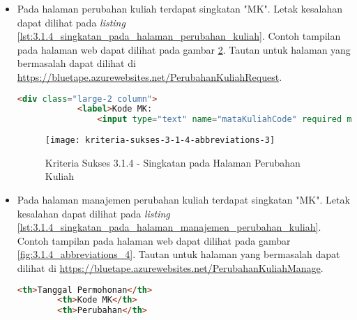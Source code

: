 \begin{itemize}
    \begin{figure}[H]
        \centering  
        \texttt{[image: kriteria-sukses-3-1-4-abbreviations-2]}  
        \caption[Kriteria Sukses 3.1.4 - Singkatan pada Halaman Manajemen Cetak Transkrip]{Kriteria Sukses 3.1.4 - Singkatan pada Halaman Manajemen Cetak Transkrip}
        \label{fig:3.1.4_abbreviations_2}  
    \end{figure}
    
    \item Pada halaman perubahan kuliah terdapat singkatan "MK". Letak kesalahan dapat dilihat pada \textit{listing} \ref{lst:3.1.4_singkatan_pada_halaman_perubahan_kuliah}. Contoh tampilan pada halaman web dapat dilihat pada gambar \ref{fig:3.1.4_abbreviations_3}. Tautan untuk halaman yang bermasalah dapat dilihat di \url{https://bluetape.azurewebsites.net/PerubahanKuliahRequest}.
    \begin{lstlisting}[frame=single, label={lst:3.1.4_singkatan_pada_halaman_perubahan_kuliah}, language=HTML, caption=Kriteria Sukses 3.1.4 - Singkatan pada Halaman Perubahan Kuliah]
        <div class="large-2 column">
            <label>Kode MK:
                <input type="text" name="mataKuliahCode" required maxlength="9" pattern="[A-Z]{3}[0-9]{3}([0-9]{3})?" title="Kode MK dalam format XYZ123"/>
    \end{lstlisting}

    \begin{figure}[H]
        \centering  
        \texttt{[image: kriteria-sukses-3-1-4-abbreviations-3]}  
        \caption[Kriteria Sukses 3.1.4 - Singkatan pada Halaman Perubahan Kuliah]{Kriteria Sukses 3.1.4 - Singkatan pada Halaman Perubahan Kuliah}
        \label{fig:3.1.4_abbreviations_3}  
    \end{figure}
    
    \item Pada halaman manajemen perubahan kuliah terdapat singkatan "MK". Letak kesalahan dapat dilihat pada \textit{listing} \ref{lst:3.1.4_singkatan_pada_halaman_manajemen_perubahan_kuliah}. Contoh tampilan pada halaman web dapat dilihat pada gambar \ref{fig:3.1.4_abbreviations_4}. Tautan untuk halaman yang bermasalah dapat dilihat di \url{https://bluetape.azurewebsites.net/PerubahanKuliahManage}.
    \begin{lstlisting}[frame=single, label={lst:3.1.4_singkatan_pada_halaman_manajemen_perubahan_kuliah}, language=HTML, caption=Kriteria Sukses 3.1.4 - Singkatan pada Halaman Manajemen Perubahan Kuliah]
        <th>Tanggal Permohonan</th>
        <th>Kode MK</th>
        <th>Perubahan</th>
    \end{lstlisting}


\end{itemize}
